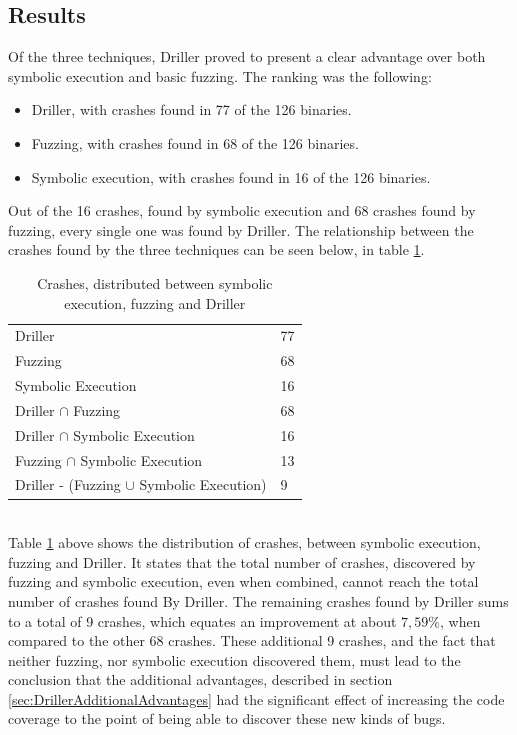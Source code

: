 \documentclass[a4paper]{article}
\begin{document}
\subsection{Results}
\label{sec:Results}
Of the three techniques, Driller proved to present a clear advantage over both symbolic execution and basic fuzzing. The ranking was the following:
\begin{itemize}
	\item[1:] Driller, with crashes found in 77 of the 126 binaries.
	\item[2:] Fuzzing, with crashes found in 68 of the 126 binaries.
	\item[3:] Symbolic execution, with crashes found in 16 of the 126 binaries.
\end{itemize}
Out of the 16 crashes, found by symbolic execution and 68 crashes found by fuzzing, every single one was found by Driller. The relationship between the crashes found by the three techniques can be seen below, in table \ref{UnionCrash}. \\
\begin{table}[h!]
	\begin{center}
		\begin{tabular}{l|l}\hline
		Driller                                 & 77 \\
		Fuzzing                                  & 68 \\
		Symbolic Execution                        & 16 \\
		Driller $\cap$ Fuzzing                     & 68 \\
		Driller $\cap$ Symbolic Execution           & 16 \\
		Fuzzing $\cap$ Symbolic Execution            & 13 \\
		Driller - (Fuzzing $\cup$ Symbolic Execution) & 9
		\end{tabular}
		\caption{Crashes, distributed between symbolic execution, fuzzing and Driller}
		\label{UnionCrash}
	\end{center}
\end{table}\\
Table \ref{UnionCrash} above shows the distribution of crashes, between symbolic execution, fuzzing and Driller. It states that the total number of crashes, discovered by fuzzing and symbolic execution, even when combined, cannot reach the total number of crashes found By Driller. The remaining crashes found by Driller sums to a total of 9 crashes, which equates an improvement at about $7,59 \%$, when compared to the other 68 crashes. These additional 9 crashes, and the fact that neither fuzzing, nor symbolic execution discovered them, must lead to the conclusion that the additional advantages, described in section \ref{sec:DrillerAdditionalAdvantages} had the significant effect of increasing the code coverage to the point of being able to discover these new kinds of bugs.
\end{document}
